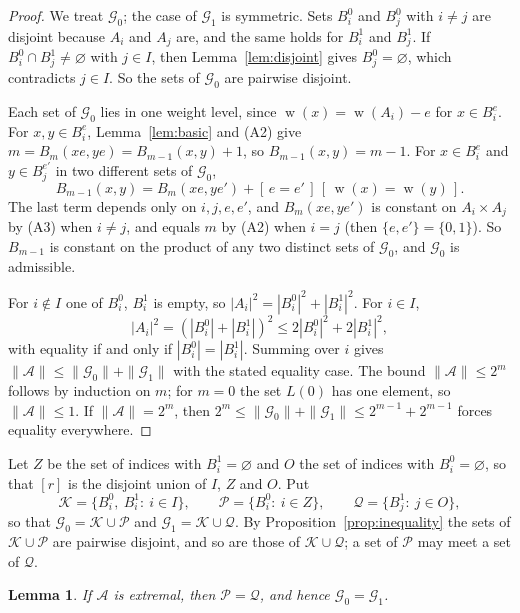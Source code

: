 \documentclass[11pt]{amsart}
\newtheorem{lemma}[theorem]{Lemma}
\theoremstyle{definition}
\theoremstyle{remark}
\numberwithin{equation}{section}
\newcommand{\cA}{\mathcal{A}}
\newcommand{\cG}{\mathcal{G}}
\newcommand{\cK}{\mathcal{K}}
\newcommand{\cP}{\mathcal{P}}
\newcommand{\cQ}{\mathcal{Q}}
\newcommand{\Iv}[1]{[\,#1\,]}
\DeclareMathOperator{\wt}{w}
\begin{document}
\begin{proof}
We treat $\cG_0$; the case of $\cG_1$ is symmetric. Sets $B_i^0$ and $B_j^0$ with $i\ne j$ are disjoint because $A_i$ and $A_j$ are, and the same holds for $B_i^1$ and $B_j^1$. If $B_i^0\cap B_j^1\ne\varnothing$ with $j\in I$, then Lemma~\ref{lem:disjoint} gives $B_j^0=\varnothing$, which contradicts $j\in I$. So the sets of $\cG_0$ are pairwise disjoint.

Each set of $\cG_0$ lies in one weight level, since $\wt(x)=\wt(A_i)-e$ for $x\in B_i^e$. For $x,y\in B_i^e$, Lemma~\ref{lem:basic} and (A2) give $m=B_m(xe,ye)=B_{m-1}(x,y)+1$, so $B_{m-1}(x,y)=m-1$. For $x\in B_i^e$ and $y\in B_j^{e'}$ in two different sets of $\cG_0$,
\[
B_{m-1}(x,y)=B_m(xe,ye')+\Iv{e=e'}\,\Iv{\wt(x)=\wt(y)} .
\]
The last term depends only on $i,j,e,e'$, and $B_m(xe,ye')$ is constant on $A_i\times A_j$ by (A3) when $i\ne j$, and equals $m$ by (A2) when $i=j$ (then $\{e,e'\}=\{0,1\}$). So $B_{m-1}$ is constant on the product of any two distinct sets of $\cG_0$, and $\cG_0$ is admissible.

For $i\notin I$ one of $B_i^0$, $B_i^1$ is empty, so $|A_i|^2=|B_i^0|^2+|B_i^1|^2$. For $i\in I$,
\[
|A_i|^2=(|B_i^0|+|B_i^1|)^2\le 2|B_i^0|^2+2|B_i^1|^2 ,
\]
with equality if and only if $|B_i^0|=|B_i^1|$. Summing over $i$ gives $\|\cA\|\le\|\cG_0\|+\|\cG_1\|$ with the stated equality case. The bound $\|\cA\|\le2^m$ follows by induction on $m$; for $m=0$ the set $L(0)$ has one element, so $\|\cA\|\le1$. If $\|\cA\|=2^m$, then $2^m\le\|\cG_0\|+\|\cG_1\|\le 2^{m-1}+2^{m-1}$ forces equality everywhere.
\end{proof}

Let $Z$ be the set of indices with $B_i^1=\varnothing$ and $O$ the set of indices with $B_i^0=\varnothing$, so that $[r]$ is the disjoint union of $I$, $Z$ and $O$. Put
\[
\cK=\{B_i^0,\ B_i^1:\ i\in I\},\qquad \cP=\{B_i^0:\ i\in Z\},\qquad \cQ=\{B_j^1:\ j\in O\},
\]
so that $\cG_0=\cK\cup\cP$ and $\cG_1=\cK\cup\cQ$. By Proposition~\ref{prop:inequality} the sets of $\cK\cup\cP$ are pairwise disjoint, and so are those of $\cK\cup\cQ$; a set of $\cP$ may meet a set of $\cQ$.

\begin{lemma}\label{lem:merge}
If $\cA$ is extremal, then $\cP=\cQ$, and hence $\cG_0=\cG_1$.
\end{lemma}
\end{document}
